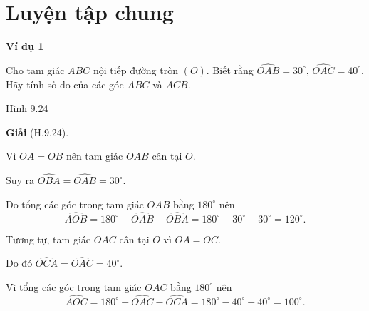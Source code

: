 
\section*{Luyện tập chung}

\begin{lesson}
    \textbf{Ví dụ 1}

    Cho tam giác $ABC$ nội tiếp đường tròn $(O)$. Biết rằng $\widehat{OAB}=30^\circ$, $\widehat{OAC}=40^\circ$. Hãy tính số đo của các góc $ABC$ và $ACB$.

    \begin{center}

        Hình 9.24
    \end{center}

    \textbf{Giải} (H.9.24).

    Vì $OA=OB$ nên tam giác $OAB$ cân tại $O$.

    Suy ra $\widehat{OBA}=\widehat{OAB}=30^\circ$.

    Do tổng các góc trong tam giác $OAB$ bằng $180^\circ$ nên
    \[
        \widehat{AOB}=180^\circ-\widehat{OAB}-\widehat{OBA}
        =180^\circ-30^\circ-30^\circ=120^\circ.
    \]

    Tương tự, tam giác $OAC$ cân tại $O$ vì $OA=OC$.

    Do đó $\widehat{OCA}=\widehat{OAC}=40^\circ$.

    Vì tổng các góc trong tam giác $OAC$ bằng $180^\circ$ nên
    \[
        \widehat{AOC}=180^\circ-\widehat{OAC}-\widehat{OCA}
        =180^\circ-40^\circ-40^\circ=100^\circ.
    \]


\end{lesson}
